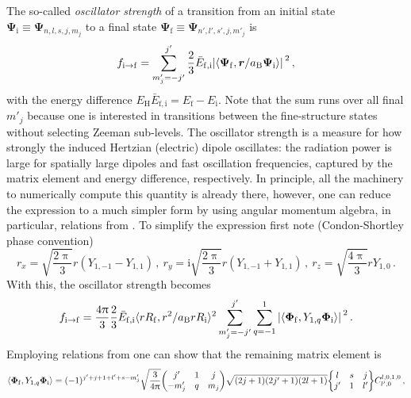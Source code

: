 \documentclass[fontsize=12pt,
               twoside=false,
               BCOR=0mm,
               DIV=14,
               overfullrule=false, %
               toc=bibliography,
               headinclude=true,
               footinclude=false]{scrartcl}
\numberwithin{equation}{section}
\newcommand{\ii}{\mathrm{i}}
\newcommand{\pii}{\uppi}
\newcommand{\aB}{a_\mathrm{B}}
\newcommand{\EH}{E_\mathrm{H}}
\begin{document}
    The so-called \emph{oscillator strength} of a transition from an initial
    state $\bm{\Psi}_\mathrm{i}\equiv\bm{\Psi}_{n,l,s,j,m_j}$ to a final state
    $\bm{\Psi}_\mathrm{f}\equiv\bm{\Psi}_{n',l',s',j,m'_j}$ is
    \cite{friedrich2017}
    \begin{equation}
        f_{\mathrm{i}\to\mathrm{f}}
        =
        \sum^{j'}_{m'_j=-j'}
        \frac{2}{3} \bar{E}_\mathrm{f,i}
        \abs*{\langle\bm{\Psi}_\mathrm{f},
                     \bm{r}\slash\aB\bm{\Psi}_\mathrm{i}\rangle}^2
    \,,
    \end{equation}
    with the energy difference
    $\EH\bar{E}_\mathrm{f,i}=E_\mathrm{f}-E_\mathrm{i}$. Note that the sum runs
    over all final $m'_j$ because one is interested in transitions between the
    fine-structure states without selecting Zeeman sub-levels. The oscillator
    strength is a measure for how strongly the induced Hertzian (electric)
    dipole oscillates: the radiation power is large for spatially large dipoles
    and fast oscillation frequencies, captured by the matrix element and energy
    difference, respectively. In principle, all the machinery to numerically
    compute this quantity is already there, however, one can reduce the
    expression to a much simpler form by using angular momentum algebra, in
    particular, relations from \cite{varshalovic1988}. To simplify the
    expression first note (Condon-Shortley phase convention)
    \begin{equation}
        r_x
        =
        \sqrt{\frac{2\pii}{3}} r (Y_{1,-1}-Y_{1,1})
    \,, \
        r_y
        =
        \ii \sqrt{\frac{2\pii}{3}} r (Y_{1,-1}+Y_{1,1})
    \,, \
        r_z
        =
        \sqrt{\frac{4\pii}{3}} r Y_{1,0}
    \,.
    \end{equation}
    With this, the oscillator strength becomes
    \begin{equation}
        f_{\mathrm{i}\to\mathrm{f}}
        =
        \frac{4\pii}{3} \frac{2}{3} \bar{E}_\mathrm{f,i}
        \langle{r}R_\mathrm{f},r^2\slash\aB{r}R_\mathrm{i}\rangle^2
        \sum^{j'}_{m'_j=-j'}
        \sum^1_{q=-1}
        \abs*{\langle\bm{\Phi}_\mathrm{f},Y_{1,q}\bm{\Phi}_\mathrm{i}\rangle}^2
    \,.
    \end{equation}
    Employing relations from \cite[p.~236,244,260,445,496]{varshalovic1988} one
    can show that the remaining matrix element is
    \begin{equation}
        \langle \bm{\Phi}_\mathrm{f}, Y_{1,q}\bm{\Phi}_\mathrm{i} \rangle
        =
        (-1)^{j'+j+1+l'+s-m'_j}
        \sqrt{\frac{3}{4\pii}}
        \mqty(j' & 1 & j \\ -m'_j & q & m_j)
        \sqrt{(2j+1)(2j'+1)(2l+1)}
        \bigg\{\mqty{l & s & j \\ j' & 1 & l'}\bigg\}
        C^{l,0,1,0}_{l',0}
    \,,
    \end{equation}
\end{document}
